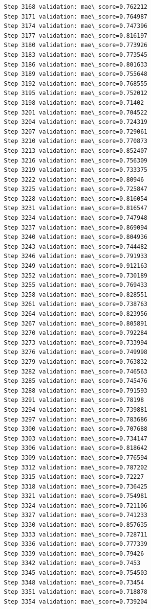 \documentclass[11pt]{article}
\begin{document}
\begin{Verbatim}[commandchars=\\\{\}]
Step 3168 validation: mae\_score=0.762212
Step 3171 validation: mae\_score=0.764987
Step 3174 validation: mae\_score=0.747396
Step 3177 validation: mae\_score=0.816197
Step 3180 validation: mae\_score=0.773926
Step 3183 validation: mae\_score=0.773545
Step 3186 validation: mae\_score=0.801633
Step 3189 validation: mae\_score=0.755648
Step 3192 validation: mae\_score=0.768555
Step 3195 validation: mae\_score=0.752012
Step 3198 validation: mae\_score=0.71402
Step 3201 validation: mae\_score=0.704522
Step 3204 validation: mae\_score=0.724319
Step 3207 validation: mae\_score=0.729061
Step 3210 validation: mae\_score=0.770873
Step 3213 validation: mae\_score=0.852407
Step 3216 validation: mae\_score=0.756309
Step 3219 validation: mae\_score=0.733375
Step 3222 validation: mae\_score=0.80946
Step 3225 validation: mae\_score=0.725847
Step 3228 validation: mae\_score=0.816054
Step 3231 validation: mae\_score=0.816547
Step 3234 validation: mae\_score=0.747948
Step 3237 validation: mae\_score=0.869094
Step 3240 validation: mae\_score=0.804936
Step 3243 validation: mae\_score=0.744482
Step 3246 validation: mae\_score=0.791933
Step 3249 validation: mae\_score=0.912163
Step 3252 validation: mae\_score=0.730189
Step 3255 validation: mae\_score=0.769433
Step 3258 validation: mae\_score=0.828551
Step 3261 validation: mae\_score=0.738763
Step 3264 validation: mae\_score=0.823956
Step 3267 validation: mae\_score=0.805891
Step 3270 validation: mae\_score=0.792284
Step 3273 validation: mae\_score=0.733994
Step 3276 validation: mae\_score=0.749998
Step 3279 validation: mae\_score=0.763832
Step 3282 validation: mae\_score=0.746563
Step 3285 validation: mae\_score=0.745476
Step 3288 validation: mae\_score=0.791593
Step 3291 validation: mae\_score=0.78198
Step 3294 validation: mae\_score=0.739881
Step 3297 validation: mae\_score=0.783686
Step 3300 validation: mae\_score=0.707688
Step 3303 validation: mae\_score=0.734147
Step 3306 validation: mae\_score=0.818642
Step 3309 validation: mae\_score=0.776594
Step 3312 validation: mae\_score=0.787202
Step 3315 validation: mae\_score=0.72227
Step 3318 validation: mae\_score=0.736425
Step 3321 validation: mae\_score=0.754981
Step 3324 validation: mae\_score=0.721106
Step 3327 validation: mae\_score=0.741233
Step 3330 validation: mae\_score=0.857635
Step 3333 validation: mae\_score=0.728711
Step 3336 validation: mae\_score=0.777339
Step 3339 validation: mae\_score=0.79426
Step 3342 validation: mae\_score=0.7453
Step 3345 validation: mae\_score=0.754503
Step 3348 validation: mae\_score=0.73454
Step 3351 validation: mae\_score=0.718878
Step 3354 validation: mae\_score=0.739204

\end{Verbatim}
\end{document}

